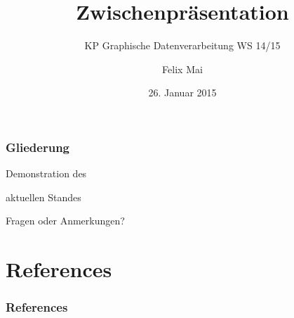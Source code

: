 \documentclass[
	ddcfooter,
	german,
]{tudbeamer}
\title{Zwischenpräsentation}
\subtitle{KP Graphische Datenverarbeitung WS 14/15}
\author{Felix Mai}
\date{26. Januar 2015}
\begin{document}
\maketitle

\begin{frame}[t]
	\frametitle*{Gliederung}
	\tableofcontents
\end{frame}








\begin{frame}[t]
	\vspace*{2.5cm}
	\centerline{\huge{Demonstration des}}
	\centerline{\huge{aktuellen Standes}}
\end{frame}


\begin{frame}[t]
	\vspace*{2.5cm}
	\centerline{\huge{Fragen oder Anmerkungen?}}
\end{frame}


\section*{References}

\begin{frame}[t]
	\frametitle*{References}
	\renewcommand*{\bibfont}{\tiny}
	\nocite{*}
	\printbibliography[title=References]
\end{frame}
\end{document}
